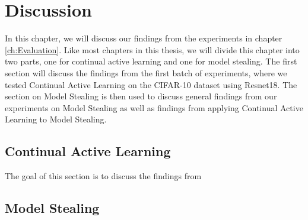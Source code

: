 
\chapter{Discussion}
\label{ch:Discussion}
In this chapter, we will discuss our findings from the experiments in chapter \ref{ch:Evaluation}. Like most chapters in this thesis, we will divide this chapter into two parts, one for continual active learning and one for model stealing. 
The first section will discuss the findings from the first batch of experiments, where we tested Continual Active Learning on the CIFAR-10 dataset using Resnet18. The section on Model Stealing is then used to discuss general findings from
our experiments on Model Stealing as well as findings from applying Continual Active Learning to Model Stealing. 

\section{Continual Active Learning}
\label{sec:Discussion:ContinualActiveLearning}
The goal of this section is to discuss the findings from


\section{Model Stealing}
\label{sec:Discussion:ModelStealing}